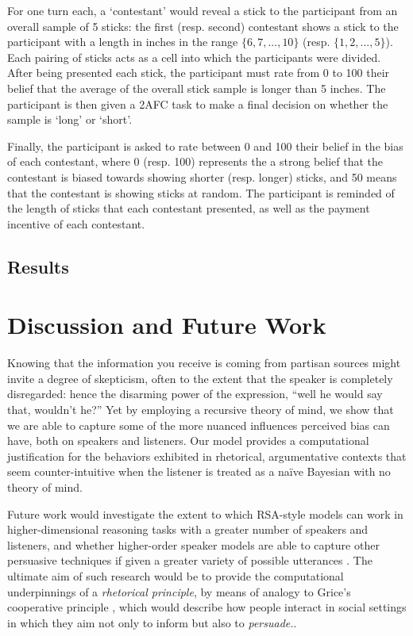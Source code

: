\documentclass[10pt,letterpaper]{article}
\begin{document}
For one turn each, a `contestant' would reveal a stick to the participant from an overall sample of 5 sticks: the first (resp. second) contestant
shows a stick to the participant with a length in inches in the range $\{6, 7, ..., 10\}$ (resp. $\{1, 2, ..., 5\}$). Each pairing of sticks acts as a cell
into which the participants were divided. After being presented each stick, the participant must rate from 0 to 100 their belief that 
the average of the overall stick sample is longer than 5 inches. The participant is then given a 2AFC task to make a final decision on whether
the sample is `long' or `short'. 

Finally, the participant is asked to rate between 0 and 100 their belief in the bias of each contestant, where 0 (resp. 100) represents
the a strong belief that the contestant is biased towards showing shorter (resp. longer) sticks, and 50 means that the contestant
is showing sticks at random. The participant is reminded of the length of sticks that each contestant presented, as well as the payment
incentive of each contestant.

\subsection{Results}


\section{Discussion and Future Work}


Knowing that the information you receive is coming from partisan sources might invite a degree of skepticism, often to
the extent that the speaker is completely disregarded: hence the disarming power of the expression, 
``well he would say that, wouldn't he?''  Yet by employing a recursive theory of
mind, we show that we are able to capture some of the more nuanced influences perceived bias can have,
both on speakers and listeners. Our model provides a computational justification for the 
behaviors exhibited in rhetorical, argumentative contexts that seem counter-intuitive when the listener is
treated as a na\"ive Bayesian with no theory of mind.

Future work would investigate the extent to which RSA-style models can work in higher-dimensional reasoning tasks with
a greater number of speakers and listeners,
and whether higher-order speaker models are able to capture other persuasive techniques if given a greater variety of
possible utterances \cite{cialdini1993influence, falk_persuasion_2018}. The ultimate aim of such research would be to
provide the computational underpinnings of a \textit{rhetorical principle}, by means of analogy to Grice's cooperative 
principle \cite{grice_logic_1975}, which would describe how people interact in social settings in which they aim not
only to inform but also to \textit{persuade.}.
\end{document}
